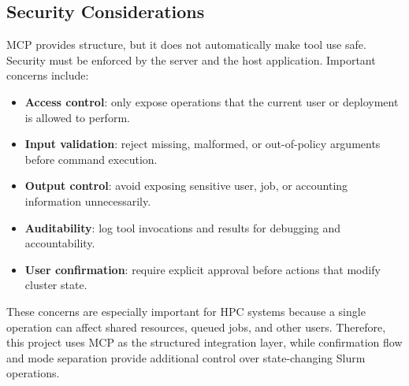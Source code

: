 \subsection{Security Considerations}

MCP provides structure, but it does not automatically make tool use safe. Security must be enforced by the server and the host application. Important concerns include:

\begin{itemize}
    \item \textbf{Access control}: only expose operations that the current user or deployment is allowed to perform.
    \item \textbf{Input validation}: reject missing, malformed, or out-of-policy arguments before command execution.
    \item \textbf{Output control}: avoid exposing sensitive user, job, or accounting information unnecessarily.
    \item \textbf{Auditability}: log tool invocations and results for debugging and accountability.
    \item \textbf{User confirmation}: require explicit approval before actions that modify cluster state.
\end{itemize}

These concerns are especially important for HPC systems because a single operation can affect shared resources, queued jobs, and other users. Therefore, this project uses MCP as the structured integration layer, while confirmation flow and mode separation provide additional control over state-changing Slurm operations.